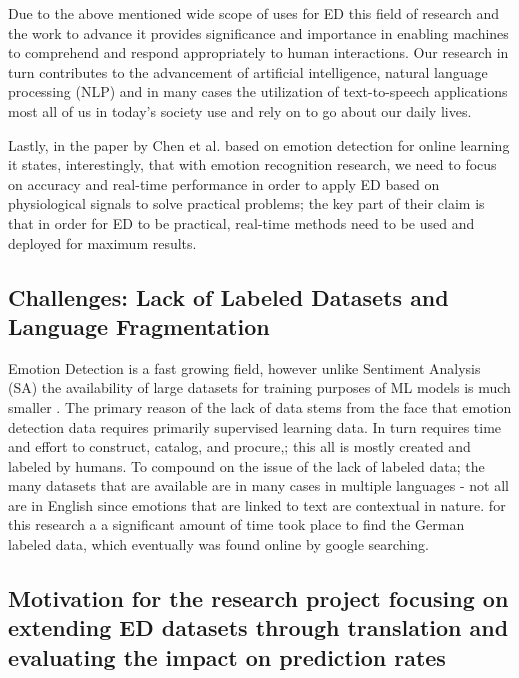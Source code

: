 \documentclass[11pt]{article}
\begin{document}
Due to the above mentioned wide scope of uses for ED this field of research and the work to advance it provides significance and importance in enabling machines to comprehend and respond appropriately to human interactions. Our research in turn contributes to the advancement of artificial intelligence, natural language processing (NLP) and in many cases the utilization of text-to-speech applications most all of us in today's society use and rely on \cite{ai-framework-detection-emotions} to go about our daily lives.

Lastly, in the paper by Chen et al.\cite{research-emotion-recognition-for-online-learning} based on emotion detection for online learning it states, interestingly, that with emotion recognition research, we need to focus on accuracy and real-time performance in order to apply ED based on physiological signals to solve practical problems; the key part of their claim is that in order for ED to be practical, real-time methods need to be used and deployed for maximum results.

\subsection{Challenges: Lack of Labeled Datasets and Language Fragmentation}
Emotion Detection is a fast growing field\cite{ACLU-ED-Data, ACLU-THE-DAWN-OF-ROBOT-SURVEILLANCE}, however unlike Sentiment Analysis (SA) the availability of large datasets for training purposes of ML models is much smaller \cite{ACLU-ED-Data, ai-framework-detection-emotions}. The primary reason of the lack of data stems from the face that emotion detection data requires primarily supervised learning data. In turn requires time and effort to construct, catalog, and procure,; this all is mostly created and labeled by humans. To compound on the issue of the lack of labeled data; the many datasets that are available are in many cases in multiple languages - not all are in English since emotions that are linked to text are contextual in nature. for this research a a significant amount of time took place to find the German labeled data, which eventually was found online by google searching.

\subsection{Motivation for the research project focusing on extending ED datasets through translation and evaluating the impact on prediction rates}
\end{document}
